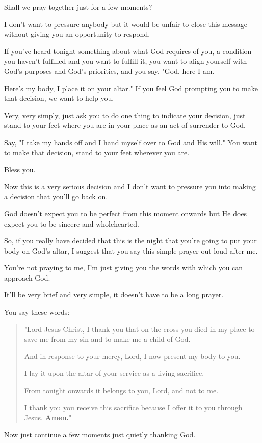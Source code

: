 \documentclass[11pt]{article}
\begin{document}
Shall we pray together just for a few moments?

I don't want to pressure anybody but it would
be unfair to close this message without giving
you an opportunity to respond.

If you've heard tonight something about what
God requires of you, a condition you haven't
fulfilled and you want to fulfill it, you want
to align yourself with God's purposes and
God's priorities, and you say, "God, here I
am.

Here's my body, I place it on your altar." If
you feel God prompting you to make that
decision, we want to help you.

Very, very simply, just ask you to do one
thing to indicate your decision, just stand to
your feet where you are in your place as an
act of surrender to God.

Say, "I take my hands off and I hand myself
over to God and His will." You want to make
that decision, stand to your feet wherever you
are.

Bless you.

Now this is a very serious decision and I
don't want to pressure you into making a
decision that you'll go back on.

God doesn't expect you to be perfect from this
moment onwards but He does expect you to be
sincere and wholehearted.

So, if you really have decided that this is
the night that you're going to put your body
on God's altar, I suggest that you say this
simple prayer out loud after me.

You're not praying to me, I'm just giving you
the words with which you can approach God.

It'll be very brief and very simple, it
doesn't have to be a long prayer.

You say these words:

\begin{quote}
"Lord Jesus Christ, I thank you that on the cross you died in my
place to save me from my sin and to make me a child of God.

And in response to your mercy, Lord, I now
present my body to you.

I lay it upon the altar of your service as a
living sacrifice.

From tonight onwards it belongs to you, Lord,
and not to me.

I thank you you receive this sacrifice because
I offer it to you through Jesus. \textbf{Amen.}"
\end{quote}

Now just continue a few moments just quietly thanking God.
\end{document}
